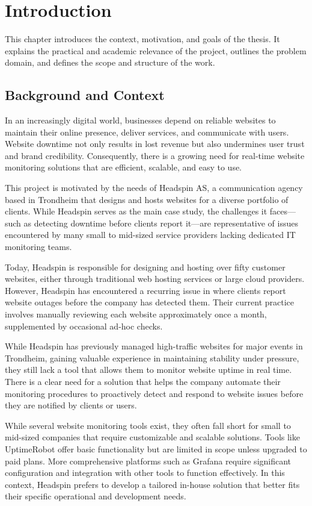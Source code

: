\chapter{Introduction}
\label{ch:introduction}

This chapter introduces the context, motivation, and goals of the thesis. It explains the practical and academic relevance of the project, outlines the problem domain, and defines the scope and structure of the work.


\section{Background and Context}
\label{sec:background}

In an increasingly digital world, businesses depend on reliable websites to maintain their online presence, deliver services, and communicate with users. Website downtime not only results in lost revenue but also undermines user trust and brand credibility. Consequently, there is a growing need for real-time website monitoring solutions that are efficient, scalable, and easy to use.

This project is motivated by the needs of Headspin AS, a communication agency based in Trondheim that designs and hosts websites for a diverse portfolio of clients. While Headspin serves as the main case study, the challenges it faces—such as detecting downtime before clients report it—are representative of issues encountered by many small to mid-sized service providers lacking dedicated IT monitoring teams.

Today, Headspin is responsible for designing and hosting over fifty customer websites, either through traditional web hosting services or large cloud providers.  However, Headspin has encountered a recurring issue in where clients report website outages before the company has detected them. Their current practice involves manually reviewing each website approximately once a month, supplemented by occasional ad-hoc checks.

While Headspin has previously managed high-traffic websites for major events in Trondheim, gaining valuable experience in maintaining stability under pressure, they still lack a tool that allows them to monitor website uptime in real time. There is a clear need for a solution that helps the company automate their monitoring procedures to proactively detect and respond to website issues before they are notified by clients or users. 

While several website monitoring tools exist, they often fall short for small to mid-sized companies that require customizable and scalable solutions. Tools like UptimeRobot \autocite{UptimeRobot} offer basic functionality but are limited in scope unless upgraded to paid plans. More comprehensive platforms such as Grafana \autocite{Grafana} require significant configuration and integration with other tools to function effectively. In this context, Headspin prefers to develop a tailored in-house solution that better fits their specific operational and development needs.


